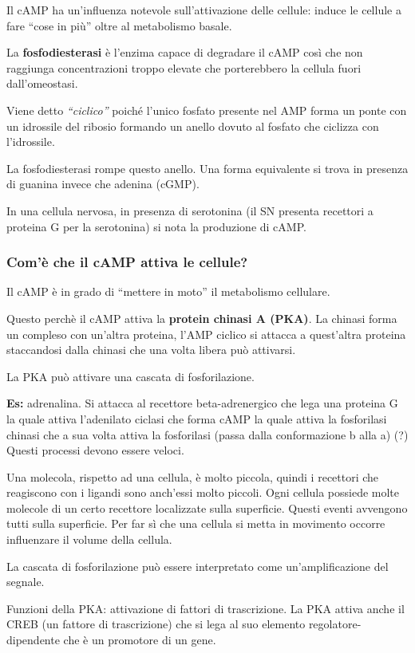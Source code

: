 \documentclass[]{article}
\begin{document}
Il cAMP ha un'influenza notevole sull'attivazione delle cellule: induce
le cellule a fare ``cose in più'' oltre al metabolismo basale.

La \textbf{fosfodiesterasi} è l'enzima capace di degradare il cAMP così
che non raggiunga concentrazioni troppo elevate che porterebbero la
cellula fuori dall'omeostasi.

Viene detto \emph{``ciclico''} poiché l'unico fosfato presente nel AMP
forma un ponte con un idrossile del ribosio formando un anello dovuto al
fosfato che ciclizza con l'idrossile.

La fosfodiesterasi rompe questo anello. Una forma equivalente si trova
in presenza di guanina invece che adenina (cGMP).

In una cellula nervosa, in presenza di serotonina (il SN presenta
recettori a proteina G per la serotonina) si nota la produzione di cAMP.

\subsubsection{Com'è che il cAMP attiva le
cellule?}\label{comuxe8-che-il-camp-attiva-le-cellule}

Il cAMP è in grado di ``mettere in moto'' il metabolismo cellulare.

Questo perchè il cAMP attiva la \textbf{protein chinasi A (PKA)}. La
chinasi forma un compleso con un'altra proteina, l'AMP ciclico si
attacca a quest'altra proteina staccandosi dalla chinasi che una volta
libera può attivarsi.

La PKA può attivare una cascata di fosforilazione.

\textbf{Es:} adrenalina. Si attacca al recettore beta-adrenergico che
lega una proteina G la quale attiva l'adenilato ciclasi che forma cAMP
la quale attiva la fosforilasi chinasi che a sua volta attiva la
fosforilasi (passa dalla conformazione b alla a) (?) Questi processi
devono essere veloci.

Una molecola, rispetto ad una cellula, è molto piccola, quindi i
recettori che reagiscono con i ligandi sono anch'essi molto piccoli.
Ogni cellula possiede molte molecole di un certo recettore localizzate
sulla superficie. Questi eventi avvengono tutti sulla superficie. Per
far sì che una cellula si metta in movimento occorre influenzare il
volume della cellula.

La cascata di fosforilazione può essere interpretato come
un'amplificazione del segnale.

Funzioni della PKA: attivazione di fattori di trascrizione. La PKA
attiva anche il CREB (un fattore di trascrizione) che si lega al suo
elemento regolatore-dipendente che è un promotore di un gene.
\end{document}
